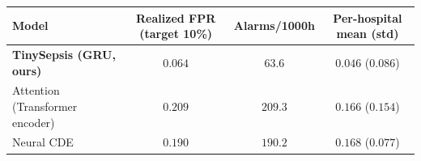 \begin{tabular}{lccc}
\toprule
Model & Realized FPR (target 10\%) & Alarms/1000h & Per-hospital mean (std) \\
\midrule
\textbf{TinySepsis (GRU, ours)} & $\mathbf{0.064}$ & $63.6$ & $0.046$ ($0.086$) \\
Attention (Transformer encoder) & $0.209$ & $209.3$ & $0.166$ ($0.154$) \\
Neural CDE & $0.190$ & $190.2$ & $0.168$ ($0.077$) \\
\bottomrule
\end{tabular}
